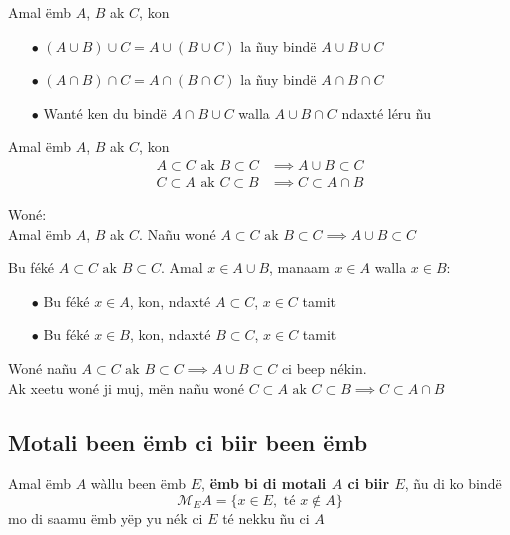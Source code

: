 \documentclass[twoside, a4paper]{article}
\begin{document}
\begin{tcolorbox}[enhanced jigsaw,breakable,pad at break*=1mm, colback=orange!5!white,colframe=white!75!black,title= Seetlu,
    watermark color=white]
  Amal ëmb $A$, $B$ ak $C$, kon
  \begin{itemize}
    \item[$\bullet$] $(A \cup B) \cup C = A \cup (B \cup C)$ la ñuy bindë $A \cup B \cup C$
    \item[$\bullet$] $(A \cap B) \cap C = A \cap (B \cap C)$ la ñuy bindë $A \cap B \cap C$
    \item[$\bullet$] Wanté ken du bindë $A \cap B \cup C$ walla $A \cup B \cap C$ ndaxté léru ñu
  \end{itemize}
\end{tcolorbox}


\begin{tcolorbox}[enhanced jigsaw,breakable,pad at break*=1mm, colback=blue!5!white,colframe=white!75!black,title= Tèg\footnote{Proposition},
    watermark color=white]
  Amal ëmb $A$, $B$ ak $C$, kon
  \begin{align*}
    A \subset C\text{ ak } B \subset C  & \implies A \cup B \subset C \\
    C \subset A \text{ ak } C \subset B & \implies C \subset A \cap B
  \end{align*}
\end{tcolorbox}
Woné:\\
Amal ëmb $A$, $B$ ak $C$. Nañu woné $A \subset C\text{ ak } B \subset C \implies A \cup B \subset C $

Bu féké $A \subset C\text{ ak } B \subset C$. Amal $x \in A \cup B$, manaam $x\in A$ walla $x\in B$:
\begin{itemize}
  \item[$\bullet$] Bu féké $x\in A$, kon, ndaxté $A \subset C$, $x \in C$ tamit
  \item[$\bullet$] Bu féké $x\in B$, kon, ndaxté $B \subset C$, $x \in C$ tamit
\end{itemize}
Woné nañu $A \subset C\text{ ak } B \subset C \implies A \cup B \subset C $ ci beep nékin.\\

Ak xeetu woné ji muj, mën nañu woné $C \subset A \text{ ak } C \subset B  \implies C \subset A \cap B $


\subsection{Motali been ëmb ci biir been ëmb}
\begin{tcolorbox}[enhanced jigsaw,breakable,pad at break*=1mm, colback=red!5!white,colframe=white!75!black,title= Téeki,watermark color=white]
  Amal ëmb $A$ wàllu been ëmb $E$, \textbf{ëmb bi di motali $A$ ci biir $E$}, ñu di ko bindë $$\mathcal{M}_{E}A = \big \{x \in E, \text{ té } x \not \in A\}$$
  mo di saamu ëmb yëp yu nék ci $E$ té nekku ñu ci $A$
\end{tcolorbox}
\end{document}
